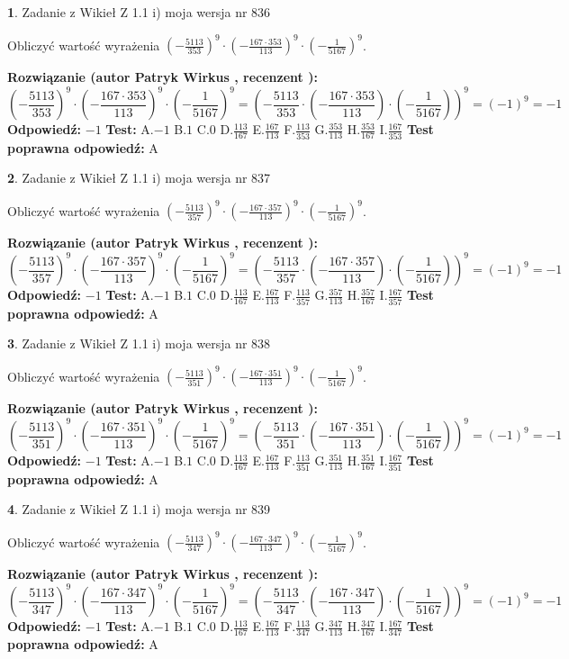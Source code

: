 \documentclass[12pt, a4paper]{article}
\theoremstyle{definition} %
\newtheorem{zad}{}
\newcommand{\zadStart}[1]{\begin{zad}#1\newline}
\newcommand{\zadStop}{\end{zad}}
\newcommand{\rozwStart}[2]{\noindent \textbf{Rozwiązanie (autor #1 , recenzent #2): }\newline}
\newcommand{\rozwStop}{\newline}
\newcommand{\odpStart}{\noindent \textbf{Odpowiedź:}\newline}
\newcommand{\odpStop}{\newline}
\newcommand{\testStart}{\noindent \textbf{Test:}\newline}
\newcommand{\testStop}{\newline}
\newcommand{\kluczStart}{\noindent \textbf{Test poprawna odpowiedź:}\newline}
\newcommand{\kluczStop}{\newline}
\begin{document}
\zadStart{Zadanie z Wikieł Z 1.1 i) moja wersja nr 836}

Obliczyć wartość wyrażenia $(-\frac{5113}{353})^{9} \cdot (-\frac{167 \cdot 353}{113})^{9} \cdot (-\frac{1}{5167})^{9}$.
\zadStop
\rozwStart{Patryk Wirkus}{}
$$(-\frac{5113}{353})^{9} \cdot (-\frac{167 \cdot 353}{113})^{9} \cdot (-\frac{1}{5167})^{9} = (-\frac{5113}{353} \cdot (-\frac{167 \cdot 353}{113}) \cdot (-\frac{1}{5167}))^{9} = (-1)^{9} = -1$$
\rozwStop
\odpStart
$-1$
\odpStop
\testStart
A.$-1$ B.$1$ C.$0$ D.$\frac{113}{167}$ E.$\frac{167}{113}$
F.$\frac{113}{353}$ G.$\frac{353}{113}$
H.$\frac{353}{167}$
I.$\frac{167}{353}$
\testStop
\kluczStart
A
\kluczStop



\zadStart{Zadanie z Wikieł Z 1.1 i) moja wersja nr 837}

Obliczyć wartość wyrażenia $(-\frac{5113}{357})^{9} \cdot (-\frac{167 \cdot 357}{113})^{9} \cdot (-\frac{1}{5167})^{9}$.
\zadStop
\rozwStart{Patryk Wirkus}{}
$$(-\frac{5113}{357})^{9} \cdot (-\frac{167 \cdot 357}{113})^{9} \cdot (-\frac{1}{5167})^{9} = (-\frac{5113}{357} \cdot (-\frac{167 \cdot 357}{113}) \cdot (-\frac{1}{5167}))^{9} = (-1)^{9} = -1$$
\rozwStop
\odpStart
$-1$
\odpStop
\testStart
A.$-1$ B.$1$ C.$0$ D.$\frac{113}{167}$ E.$\frac{167}{113}$
F.$\frac{113}{357}$ G.$\frac{357}{113}$
H.$\frac{357}{167}$
I.$\frac{167}{357}$
\testStop
\kluczStart
A
\kluczStop



\zadStart{Zadanie z Wikieł Z 1.1 i) moja wersja nr 838}

Obliczyć wartość wyrażenia $(-\frac{5113}{351})^{9} \cdot (-\frac{167 \cdot 351}{113})^{9} \cdot (-\frac{1}{5167})^{9}$.
\zadStop
\rozwStart{Patryk Wirkus}{}
$$(-\frac{5113}{351})^{9} \cdot (-\frac{167 \cdot 351}{113})^{9} \cdot (-\frac{1}{5167})^{9} = (-\frac{5113}{351} \cdot (-\frac{167 \cdot 351}{113}) \cdot (-\frac{1}{5167}))^{9} = (-1)^{9} = -1$$
\rozwStop
\odpStart
$-1$
\odpStop
\testStart
A.$-1$ B.$1$ C.$0$ D.$\frac{113}{167}$ E.$\frac{167}{113}$
F.$\frac{113}{351}$ G.$\frac{351}{113}$
H.$\frac{351}{167}$
I.$\frac{167}{351}$
\testStop
\kluczStart
A
\kluczStop



\zadStart{Zadanie z Wikieł Z 1.1 i) moja wersja nr 839}

Obliczyć wartość wyrażenia $(-\frac{5113}{347})^{9} \cdot (-\frac{167 \cdot 347}{113})^{9} \cdot (-\frac{1}{5167})^{9}$.
\zadStop
\rozwStart{Patryk Wirkus}{}
$$(-\frac{5113}{347})^{9} \cdot (-\frac{167 \cdot 347}{113})^{9} \cdot (-\frac{1}{5167})^{9} = (-\frac{5113}{347} \cdot (-\frac{167 \cdot 347}{113}) \cdot (-\frac{1}{5167}))^{9} = (-1)^{9} = -1$$
\rozwStop
\odpStart
$-1$
\odpStop
\testStart
A.$-1$ B.$1$ C.$0$ D.$\frac{113}{167}$ E.$\frac{167}{113}$
F.$\frac{113}{347}$ G.$\frac{347}{113}$
H.$\frac{347}{167}$
I.$\frac{167}{347}$
\testStop
\kluczStart
A
\kluczStop
\end{document}
